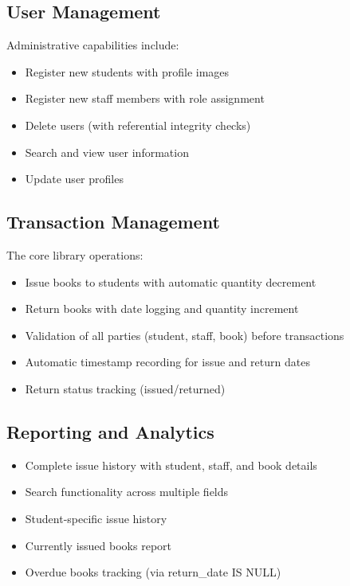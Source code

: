 \documentclass[12pt,a4paper]{article}
\begin{document}
\subsection{User Management}

Administrative capabilities include:
\begin{itemize}
    \item Register new students with profile images
    \item Register new staff members with role assignment
    \item Delete users (with referential integrity checks)
    \item Search and view user information
    \item Update user profiles
\end{itemize}

\subsection{Transaction Management}

The core library operations:
\begin{itemize}
    \item Issue books to students with automatic quantity decrement
    \item Return books with date logging and quantity increment
    \item Validation of all parties (student, staff, book) before transactions
    \item Automatic timestamp recording for issue and return dates
    \item Return status tracking (issued/returned)
\end{itemize}

\subsection{Reporting and Analytics}

\begin{itemize}
    \item Complete issue history with student, staff, and book details
    \item Search functionality across multiple fields
    \item Student-specific issue history
    \item Currently issued books report
    \item Overdue books tracking (via return\_date IS NULL)
\end{itemize}
\end{document}
